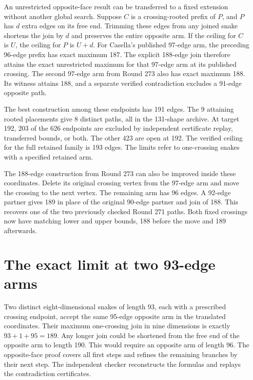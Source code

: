 \documentclass[11pt,a4paper]{article}
\theoremstyle{definition}
\theoremstyle{remark}
\begin{document}
An unrestricted opposite-face result can be transferred to a fixed extension without another global search. Suppose \(C\) is a crossing-rooted prefix of \(P\), and \(P\) has \(d\) extra edges on its free end. Trimming these edges from any joined snake shortens the join by \(d\) and preserves the entire opposite arm. If the ceiling for \(C\) is \(U\), the ceiling for \(P\) is \(U+d\). For Casella's published 97-edge arm, the preceding 96-edge prefix has exact maximum 187. The explicit 188-edge join therefore attains the exact unrestricted maximum for that 97-edge arm at its published crossing. The second 97-edge arm from Round 273 also has exact maximum 188. Its witness attains 188, and a separate verified contradiction excludes a 91-edge opposite path.

The best construction among these endpoints has 191 edges. The 9 attaining rooted placements give 8 distinct paths, all in the 131-shape archive. At target 192, 203 of the 626 endpoints are excluded by independent certificate replay, transferred bounds, or both. The other 423 are open at 192. The verified ceiling for the full retained family is 193 edges. The limits refer to one-crossing snakes with a specified retained arm.

The 188-edge construction from Round 273 can also be improved inside these coordinates. Delete its original crossing vertex from the 97-edge arm and move the crossing to the next vertex. The remaining arm has 96 edges. A 92-edge partner gives 189 in place of the original 90-edge partner and join of 188. This recovers one of the two previously checked Round 271 paths. Both fixed crossings now have matching lower and upper bounds, 188 before the move and 189 afterwards.

\section{The exact limit at two 93-edge arms}
Two distinct eight-dimensional snakes of length 93, each with a prescribed crossing endpoint, accept the same 95-edge opposite arm in the translated coordinates. Their maximum one-crossing join in nine dimensions is exactly \(93+1+95=189\). Any longer join could be shortened from the free end of the opposite arm to length 190. This would require an opposite arm of length 96. The opposite-face proof covers all first steps and refines the remaining branches by their next step. The independent checker reconstructs the formulas and replays the contradiction certificates.
\end{document}
